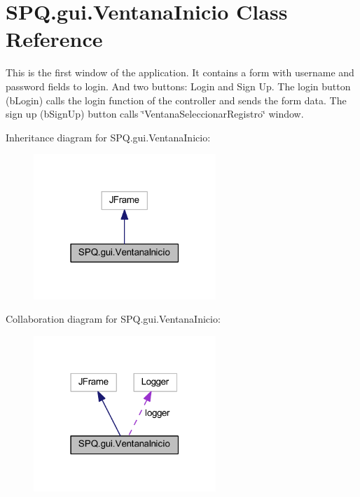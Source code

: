 \hypertarget{class_s_p_q_1_1gui_1_1_ventana_inicio}{}\section{S\+P\+Q.\+gui.\+Ventana\+Inicio Class Reference}
\label{class_s_p_q_1_1gui_1_1_ventana_inicio}


This is the first window of the application. It contains a form with username and password fields to login. And two buttons\+: Login and Sign Up. The login button (b\+Login) calls the login function of the controller and sends the form data. The sign up (b\+Sign\+Up) button calls \char`\"{}\+Ventana\+Seleccionar\+Registro\char`\"{} window.  




Inheritance diagram for S\+P\+Q.\+gui.\+Ventana\+Inicio\+:
\nopagebreak
\begin{figure}[H]
\begin{center}
\leavevmode
\includegraphics[width=195pt]{class_s_p_q_1_1gui_1_1_ventana_inicio__inherit__graph}
\end{center}
\end{figure}


Collaboration diagram for S\+P\+Q.\+gui.\+Ventana\+Inicio\+:
\nopagebreak
\begin{figure}[H]
\begin{center}
\leavevmode
\includegraphics[width=195pt]{class_s_p_q_1_1gui_1_1_ventana_inicio__coll__graph}
\end{center}
\end{figure}
